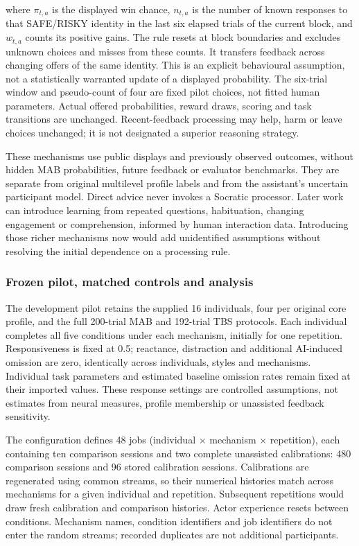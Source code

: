 \documentclass[11pt,a4paper]{article}
\begin{document}
where $\pi_{t,a}$ is the displayed win chance, $n_{t,a}$ is the number of known responses to that SAFE/RISKY identity in the last six elapsed trials of the current block, and $w_{t,a}$ counts its positive gains. The rule resets at block boundaries and excludes unknown choices and misses from these counts. It transfers feedback across changing offers of the same identity. This is an explicit behavioural assumption, not a statistically warranted update of a displayed probability. The six-trial window and pseudo-count of four are fixed pilot choices, not fitted human parameters. Actual offered probabilities, reward draws, scoring and task transitions are unchanged. Recent-feedback processing may help, harm or leave choices unchanged; it is not designated a superior reasoning strategy.

These mechanisms use public displays and previously observed outcomes, without hidden MAB probabilities, future feedback or evaluator benchmarks. They are separate from original multilevel profile labels and from the assistant's uncertain participant model. Direct advice never invokes a Socratic processor. Later work can introduce learning from repeated questions, habituation, changing engagement or comprehension, informed by human interaction data. Introducing those richer mechanisms now would add unidentified assumptions without resolving the initial dependence on a processing rule.

\subsubsection{Frozen pilot, matched controls and analysis}
The development pilot retains the supplied 16 individuals, four per original core profile, and the full 200-trial MAB and 192-trial TBS protocols. Each individual completes all five conditions under each mechanism, initially for one repetition. Responsiveness is fixed at 0.5; reactance, distraction and additional AI-induced omission are zero, identically across individuals, styles and mechanisms. Individual task parameters and estimated baseline omission rates remain fixed at their imported values. These response settings are controlled assumptions, not estimates from neural measures, profile membership or unassisted feedback sensitivity.

The configuration defines 48 jobs (individual $\times$ mechanism $\times$ repetition), each containing ten comparison sessions and two complete unassisted calibrations: 480 comparison sessions and 96 stored calibration sessions. Calibrations are regenerated using common streams, so their numerical histories match across mechanisms for a given individual and repetition. Subsequent repetitions would draw fresh calibration and comparison histories. Actor experience resets between conditions. Mechanism names, condition identifiers and job identifiers do not enter the random streams; recorded duplicates are not additional participants.
\end{document}
